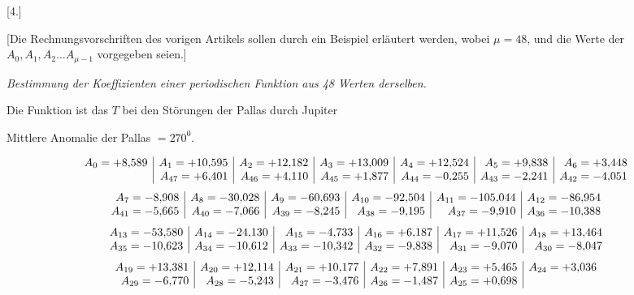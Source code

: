 \clearpage
\begin{landscape}
\begingroup
\fontsize{9.5}{12}\selectfont
{}
\renewcommand{\headrulewidth}{0pt}
\setlength{\lineskip}{4pt}\setlength{\lineskiplimit}{4pt}
\setlength{\arraycolsep}{4pt}
\begin{center}[4.]\end{center}
\par\noindent\hspace*{\parindent}[Die Rechnungsvorschriften des vorigen Artikels sollen durch ein Beispiel erläutert werden, wobei \(\mu=48\), und die Werte der \(A_0, A_1, A_2\ldots A_{\mu-1}\) vorgegeben seien.]
\begin{center}
\textit{Bestimmung der Koeffizienten einer periodischen Funktion aus 48 Werten derselben.}\par
\medskip
Die Funktion ist das \(T\) bei den Störungen der Pallas durch Jupiter\par
Mittlere Anomalie der Pallas \(=270^0\).
\end{center}
\[
\begin{array}{@{}r|r|r|r|r|r|r@{}}
A_0=+8{,}589&A_1=+10{,}595&A_2=+12{,}182&A_3=+13{,}009&A_4=+12{,}524&A_5=+9{,}838&A_6=+3{,}448\\
&A_{47}=+6{,}401&A_{46}=+4{,}110&A_{45}=+1{,}877&A_{44}=-0{,}255&A_{43}=-2{,}241&A_{42}=-4{,}051
\end{array}
\]
\[
\begin{array}{@{}r|r|r|r|r|r@{}}
A_7=-8{,}908&A_8=-30{,}028&A_9=-60{,}693&A_{10}=-92{,}504&A_{11}=-105{,}044&A_{12}=-86{,}954\\
A_{41}=-5{,}665&A_{40}=-7{,}066&A_{39}=-8{,}245&A_{38}=-9{,}195&A_{37}=-9{,}910&A_{36}=-10{,}388
\end{array}
\]
\[
\begin{array}{@{}r|r|r|r|r|r@{}}
A_{13}=-53{,}580&A_{14}=-24{,}130&A_{15}=-4{,}733&A_{16}=+6{,}187&A_{17}=+11{,}526&A_{18}=+13{,}464\\
A_{35}=-10{,}623&A_{34}=-10{,}612&A_{33}=-10{,}342&A_{32}=-9{,}838&A_{31}=-9{,}070&A_{30}=-8{,}047
\end{array}
\]
\[
\begin{array}{@{}r|r|r|r|r|r@{}}
A_{19}=+13{,}381&A_{20}=+12{,}114&A_{21}=+10{,}177&A_{22}=+7{,}891&A_{23}=+5{,}465&A_{24}=+3{,}036\\
A_{29}=-6{,}770&A_{28}=-5{,}243&A_{27}=-3{,}476&A_{26}=-1{,}487&A_{25}=+0{,}698&
\end{array}
\]
\end{landscape}
